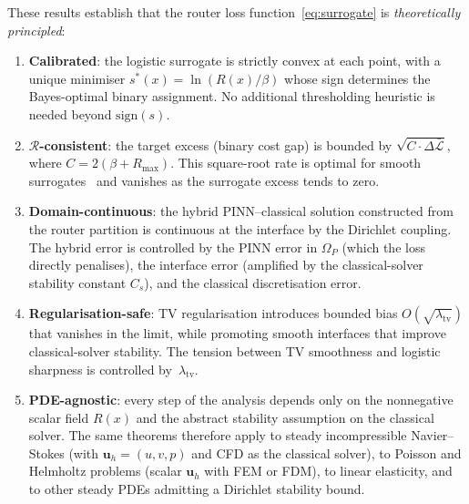 \documentclass[11pt]{article}
\newcommand{\Lcal}{\mathcal{L}}
\newcommand{\Rcal}{\mathcal{R}}
\begin{document}
These results establish that the router loss function~\eqref{eq:surrogate} is
\emph{theoretically principled}:
\begin{enumerate}
\item \textbf{Calibrated}: the logistic surrogate is strictly convex at each point,
  with a unique minimiser $s^*(x) = \ln(R(x)/\beta)$ whose sign determines the
  Bayes-optimal binary assignment.  No additional thresholding heuristic is needed
  beyond $\mathrm{sign}(s)$.
\item \textbf{$\Rcal$-consistent}: the target excess (binary cost gap) is bounded by
  $\sqrt{C \cdot \Delta\bar{\Lcal}}$, where $C = 2(\beta + R_{\max})$.  This
  square-root rate is optimal for smooth surrogates~\cite{bartlett2006convexity} and
  vanishes as the surrogate excess tends to zero.
\item \textbf{Domain-continuous}: the hybrid PINN--classical solution constructed
  from the router partition is continuous at the interface by the Dirichlet
  coupling.  The hybrid error is controlled by the PINN error in $\Omega_P$
  (which the loss directly penalises), the interface error (amplified by the
  classical-solver stability constant $C_s$), and the classical discretisation
  error.
\item \textbf{Regularisation-safe}: TV regularisation introduces bounded bias
  $O(\sqrt{\lambda_{\mathrm{tv}}})$ that vanishes in the limit, while promoting
  smooth interfaces that improve classical-solver stability.  The tension between
  TV smoothness and logistic sharpness is controlled by~$\lambda_{\mathrm{tv}}$.
\item \textbf{PDE-agnostic}: every step of the analysis depends only on the
  nonnegative scalar field $R(x)$ and the abstract stability assumption on the
  classical solver.  The same theorems therefore apply to steady incompressible
  Navier--Stokes (with $\mathbf{u}_h = (u, v, p)$ and CFD as the classical
  solver), to Poisson and Helmholtz problems (scalar $\mathbf{u}_h$ with FEM or
  FDM), to linear elasticity, and to other steady PDEs admitting a Dirichlet
  stability bound.
\end{enumerate}
\end{document}
